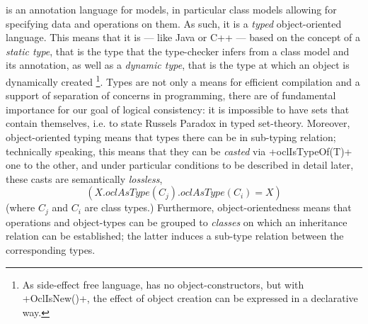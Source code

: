 \OCL is an annotation language for \UML models, in particular class models 
allowing for specifying data and operations on them. As such, it
is a \emph{typed} object-oriented language. This means that it is --- like 
Java or C++ --- based on the concept of a \emph{static type}, that is the type 
that the type-checker infers from a \UML class model and its \OCL annotation, as 
well as a \emph{dynamic type}, that is the type at which an object is dynamically created 
\footnote{As side-effect free language, \OCL has no object-constructors, but with 
\inlineocl+OclIsNew()+, the effect of object creation can be expressed in a 
declarative way.}. Types are not only a means for efficient compilation
and a support of separation of concerns in programming, there are of fundamental 
importance for our goal of logical consistency: it is impossible to have 
sets that contain themselves, i.e. to state Russels Paradox in \OCL typed set-theory. 
Moreover, object-oriented typing means that types there can be in sub-typing
relation; technically speaking, this means that they can be \emph{casted} via 
\inlineocl+oclIsTypeOf(T)+ one to the other, and under particular conditions to be 
described in detail later, these casts  are semantically \emph{lossless}, \ie{}
\begin{equation}
 (X.oclAsType(C_j).oclAsType(C_i) = X)
\end{equation}
(where $C_j$ and $C_i$ are class types.)
Furthermore, object-orientedness means that operations and object-types can be
grouped to \emph{classes} on which an inheritance relation can be established;
the latter induces a sub-type relation between the corresponding types.

